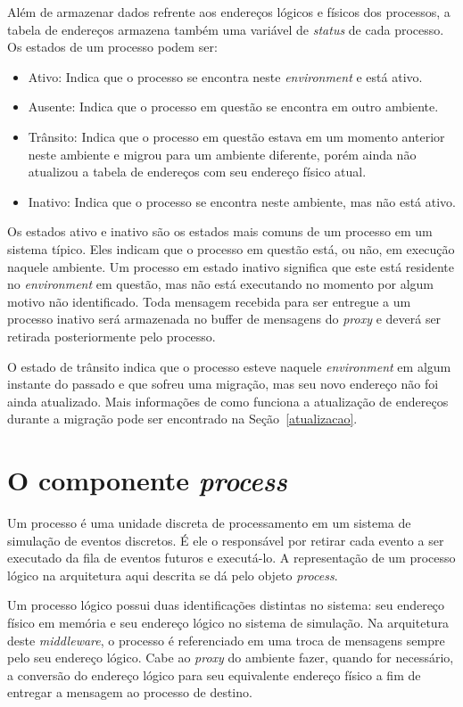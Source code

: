 Além de armazenar dados refrente aos endereços lógicos e físicos dos processos, a tabela de endereços armazena também uma variável de \textit{status} de cada processo. Os estados de um processo podem ser:

\begin{itemize}
\item Ativo: Indica que o processo se encontra neste \textit{environment} e está ativo. 
\item Ausente: Indica que o processo em questão se encontra em outro ambiente.
\item Trânsito: Indica que o processo em questão estava em um momento anterior neste ambiente e migrou para um ambiente diferente, porém ainda não atualizou a tabela de endereços com seu endereço físico atual.
\item Inativo: Indica que o processo se encontra neste ambiente, mas não está ativo.
\end{itemize}

Os estados ativo e inativo são os estados mais comuns de um processo em um sistema típico. Eles indicam que o processo em questão está, ou não, em execução naquele ambiente. Um processo em estado inativo significa que este está residente no \textit{environment} em questão, mas não está executando no momento por algum motivo não identificado. Toda mensagem recebida para ser entregue a um processo inativo será armazenada no buffer de mensagens do \textit{proxy} e deverá ser retirada posteriormente pelo processo.

O estado de trânsito indica que o processo esteve naquele \textit{environment} em algum instante do passado e que sofreu uma migração, mas seu novo endereço não foi ainda atualizado. Mais informações de como funciona a atualização de endereços durante a migração pode ser encontrado na Seção~\ref{atualizacao}.

\section{O componente \textit{process} \label{process}}

Um processo é uma unidade discreta de processamento em um sistema de simulação de eventos discretos. É ele o responsável por retirar cada evento a ser executado da fila de eventos futuros e executá-lo. A representação de um processo lógico na arquitetura aqui descrita se dá pelo objeto \textit{process}.

Um processo lógico possui duas identificações distintas no sistema: seu endereço físico em memória e seu endereço lógico no sistema de simulação. Na arquitetura deste \textit{middleware}, o processo é referenciado em uma troca de mensagens sempre pelo seu endereço lógico. Cabe ao \textit{proxy} do ambiente fazer, quando for necessário, a conversão do endereço lógico para seu equivalente endereço físico a fim de entregar a mensagem ao processo de destino.

